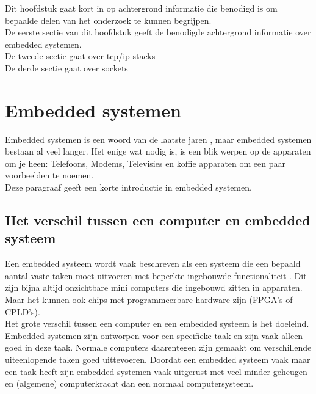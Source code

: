 \documentclass[../DCM2_Verslag.tex]{subfiles}
\begin{document}
Dit hoofdstuk gaat kort in op achtergrond informatie die benodigd is om bepaalde delen van het onderzoek te kunnen begrijpen.
\\
De eerste sectie van dit hoofdstuk geeft de benodigde achtergrond informatie over embedded systemen.
\\
De tweede sectie gaat over tcp/ip stacks
\\
De derde sectie gaat over sockets

\section{Embedded systemen}
Embedded systemen is een woord van de laatste jaren \cite{DAC99}, maar embedded systemen bestaan al veel langer. Het enige wat nodig is, is een blik werpen op de apparaten om je heen: Telefoons, Modems, Televisies en koffie apparaten om een paar voorbeelden te noemen. 
\\
Deze paragraaf geeft een korte introductie in embedded systemen.

\subsection{Het verschil tussen een computer en embedded systeem}
Een embedded systeem wordt vaak beschreven als een systeem die een bepaald aantal vaste taken moet uitvoeren met beperkte ingebouwde functionaliteit \parencite{DAC99}. Dit zijn bijna altijd onzichtbare mini computers die ingebouwd zitten in apparaten. \\Maar het kunnen ook chips met programmeerbare hardware zijn (FPGA's of CPLD's). 
\\
Het grote verschil tussen een computer en een embedded systeem is het doeleind. Embedded systemen zijn ontworpen voor een specifieke taak en zijn vaak alleen goed in deze taak. Normale computers daarentegen zijn gemaakt om verschillende uiteenlopende taken goed uittevoeren. Doordat een embedded systeem vaak maar een taak heeft zijn embedded systemen vaak uitgerust met veel minder geheugen en (algemene) computerkracht dan een normaal computersysteem.
\end{document}
